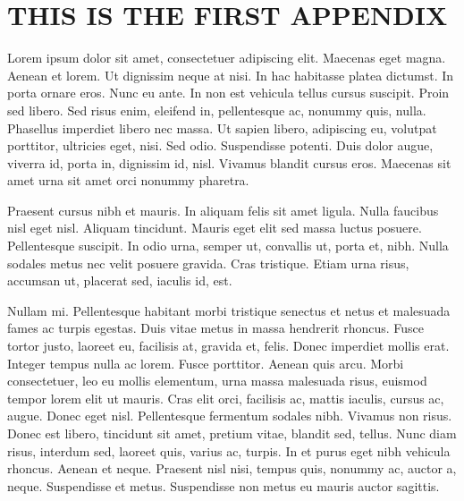 
\chapter{THIS IS THE FIRST APPENDIX}

Lorem ipsum dolor sit amet, consectetuer adipiscing elit. Maecenas
eget magna. Aenean et lorem. Ut dignissim neque at nisi. In hac
habitasse platea dictumst. In porta ornare eros. Nunc eu ante. In
non est vehicula tellus cursus suscipit. Proin sed libero. Sed risus
enim, eleifend in, pellentesque ac, nonummy quis, nulla. Phasellus
imperdiet libero nec massa. Ut sapien libero, adipiscing eu,
volutpat porttitor, ultricies eget, nisi. Sed odio. Suspendisse
potenti. Duis dolor augue, viverra id, porta in, dignissim id, nisl.
Vivamus blandit cursus eros. Maecenas sit amet urna sit amet orci
nonummy pharetra.

Praesent cursus nibh et mauris. In aliquam felis sit amet ligula.
Nulla faucibus nisl eget nisl. Aliquam tincidunt. Mauris eget elit
sed massa luctus posuere. Pellentesque suscipit. In odio urna,
semper ut, convallis ut, porta et, nibh. Nulla sodales metus nec
velit posuere gravida. Cras tristique. Etiam urna risus, accumsan
ut, placerat sed, iaculis id, est.

Nullam mi. Pellentesque habitant morbi tristique senectus et netus
et malesuada fames ac turpis egestas. Duis vitae metus in massa
hendrerit rhoncus. Fusce tortor justo, laoreet eu, facilisis at,
gravida et, felis. Donec imperdiet mollis erat. Integer tempus nulla
ac lorem. Fusce porttitor. Aenean quis arcu. Morbi consectetuer, leo
eu mollis elementum, urna massa malesuada risus, euismod tempor
lorem elit ut mauris. Cras elit orci, facilisis ac, mattis iaculis,
cursus ac, augue. Donec eget nisl. Pellentesque fermentum sodales
nibh. Vivamus non risus. Donec est libero, tincidunt sit amet,
pretium vitae, blandit sed, tellus. Nunc diam risus, interdum sed,
laoreet quis, varius ac, turpis. In et purus eget nibh vehicula
rhoncus. Aenean et neque. Praesent nisl nisi, tempus quis, nonummy
ac, auctor a, neque. Suspendisse et metus. Suspendisse non metus eu
mauris auctor sagittis.
